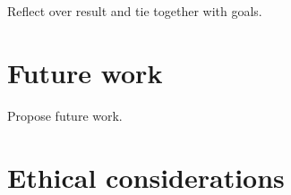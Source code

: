 Reflect over result and tie together with goals.
\section{Future work}
Propose future work.
\section{Ethical considerations}
